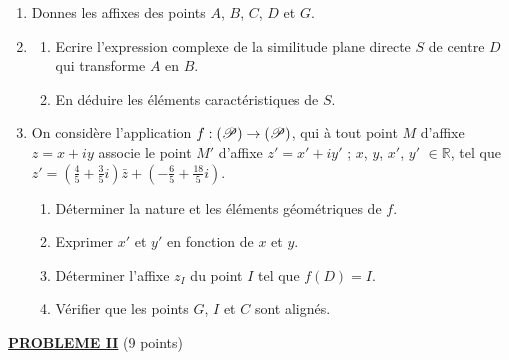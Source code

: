 \begin{description}
                  \begin{enumerate}
                        \item Donnes les affixes des points $A$, $B$, $C$, $D$ et $G$.
                        \item \begin{enumerate}
                                    \item Ecrire l'expression complexe de la similitude plane directe $S$ de centre $D$
                                          qui transforme $A$ en $B$.
                                    \item En d\'eduire les \'el\'ements caract\'eristiques de $S$.
                              \end{enumerate}
                        \item On consid\`ere l'application $f : (\mathscr{P}) \rightarrow (\mathscr{P})$, qui \`a tout point $M$ d'affixe
                              $z = x + i y$ associe le point $M'$ d'affixe $z' = x' + i y'$ ;
                              $x$, $y$, $x'$, $y'$ $\in \mathbb{R}$, tel que 
                              $z' = 
                              \left( \frac{4}{5} + \frac{3}{5} i \right) \bar{z} + \left( -\frac{6}{5} + \frac{18}{5} i \right)$.
                              \begin{enumerate}
                                    \item D\'eterminer la nature et les \'el\'ements g\'eom\'etriques de $f$.
                                    \item Exprimer $x'$ et $y'$ en fonction de $x$ et $y$.
                                    \item D\'eterminer l'affixe $z_I$ du point $I$ tel que $f(D) = I$.
                                    \item V\'erifier que les points $G$, $I$ et $C$ sont align\'es.
                              \end{enumerate}
                  \end{enumerate}
      \end{description}
\noindent \underline{\textsc{\textbf{PROBLEME II}}} (9 points) \newline
